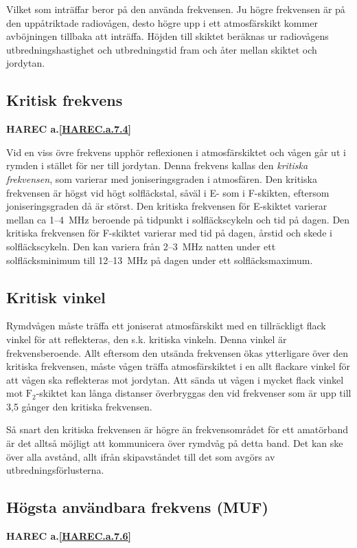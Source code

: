 Vilket som inträffar beror på den använda frekvensen. Ju högre
frekvensen är på den uppåtriktade radiovågen, desto högre upp i ett
atmosfärskikt kommer avböjningen tillbaka att inträffa. Höjden till
skiktet beräknas ur radiovågens utbredningshastighet och
utbredningstid fram och åter mellan skiktet och jordytan.

\subsection{Kritisk frekvens}
\textbf{
HAREC a.\ref{HAREC.a.7.4}\label{myHAREC.a.7.4}
}

Vid en viss övre frekvens upphör reflexionen i atmosfärskiktet och
vågen går ut i rymden i stället för ner till jordytan. Denna frekvens
kallas den \emph{kritiska frekvensen}, som varierar med
joniseringsgraden i atmosfären. Den kritiska frekvensen är högst vid
högt solfläckstal, såväl i E- som i F-skikten, eftersom
joniseringsgraden då är störst. Den kritiska frekvensen för E-skiktet
varierar mellan ca 1--4~MHz beroende på tidpunkt i solfläckscykeln
och tid på dagen. Den kritiska frekvensen för F-skiktet varierar med
tid på dagen, årstid och skede i solfläckscykeln. Den kan variera
från 2--3~MHz natten under ett solfläcksminimum till 12--13~MHz på
dagen under ett solfläcksmaximum.

\subsection{Kritisk vinkel}

Rymdvågen måste träffa ett joniserat atmosfärskikt med en tillräckligt
flack vinkel för att reflekteras, den s.k. kritiska vinkeln. Denna
vinkel är frekvensberoende. Allt eftersom den utsända frekvensen ökas
ytterligare över den kritiska frekvensen, måste vågen träffa
atmosfärskiktet i en allt flackare vinkel för att vågen ska
reflekteras mot jordytan. Att sända ut vågen i mycket flack vinkel
mot \(\mathrm{F_2}\)-skiktet kan långa distanser överbryggas den vid
frekvenser som är upp till 3,5 gånger den kritiska frekvensen.

Så snart den kritiska frekvensen är högre än frekvensområdet för ett
amatörband är det alltså möjligt att kommunicera över rymdvåg på detta
band. Det kan ske över alla avstånd, allt ifrån skipavståndet till det
som avgörs av utbredningsförlusterna.

\subsection{Högsta användbara frekvens (MUF)}
\textbf{
HAREC a.\ref{HAREC.a.7.6}\label{myHAREC.a.7.6}
}

